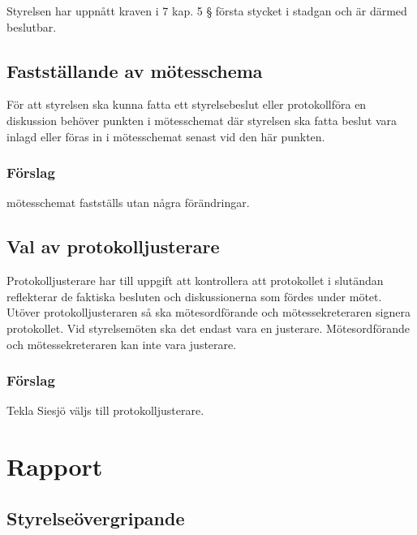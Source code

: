 \documentclass[protokoll]{dvd}
\begin{document}
\begin{attsatser}
    \item Styrelsen har uppnått kraven i 7 kap.
          5 § första stycket i stadgan och är därmed beslutbar.
\end{attsatser}

\subsection{Fastställande av mötesschema}

För att styrelsen ska kunna fatta ett styrelsebeslut eller protokollföra en diskussion
behöver punkten i mötesschemat där styrelsen ska fatta beslut
vara inlagd eller föras in i mötesschemat senast vid den här punkten.

\subsubsection*{Förslag}

\begin{attsatser}
    \item mötesschemat fastställs utan några förändringar.
\end{attsatser}

\subsection{Val av protokolljusterare}

Protokolljusterare har till uppgift att kontrollera att protokollet
i slutändan reflekterar de faktiska besluten och diskussionerna som fördes under mötet.
Utöver protokolljusteraren så ska mötesordförande och mötessekreteraren signera protokollet.
Vid styrelsemöten ska det endast vara en justerare.
Mötesordförande och mötessekreteraren kan inte vara justerare.

\subsubsection*{Förslag}
\begin{attsatser}
    \item Tekla Siesjö väljs till protokolljusterare.
\end{attsatser}

\section{Rapport}

\subsection{Styrelseövergripande}
\end{document}
